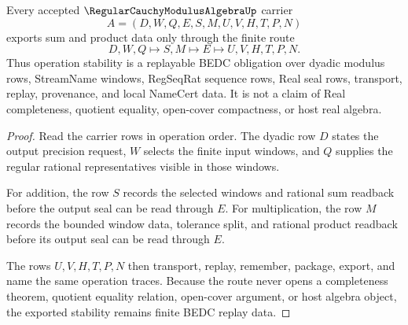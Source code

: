 \begin{theorem}
\label{thm:regular-cauchy-modulus-algebra-operation-replay}
Every accepted $\RegularCauchyModulusAlgebraUp$ carrier
$$
A=(D,W,Q,E,S,M,U,V,H,T,P,N)
$$
exports sum and product data only through the finite route
$$
D,W,Q \longmapsto S,M \longmapsto E \longmapsto U,V,H,T,P,N .
$$
Thus operation stability is a replayable BEDC obligation over dyadic modulus rows, StreamName windows, RegSeqRat sequence rows, Real seal rows, transport, replay, provenance, and local NameCert data. It is not a claim of Real completeness, quotient equality, open-cover compactness, or host real algebra.
\end{theorem}
\begin{proof}
Read the carrier rows in operation order. The dyadic row $D$ states the output precision request, $W$ selects the finite input windows, and $Q$ supplies the regular rational representatives visible in those windows.

For addition, the row $S$ records the selected windows and rational sum readback before the output seal can be read through $E$. For multiplication, the row $M$ records the bounded window data, tolerance split, and rational product readback before its output seal can be read through $E$.

The rows $U,V,H,T,P,N$ then transport, replay, remember, package, export, and name the same operation traces. Because the route never opens a completeness theorem, quotient equality relation, open-cover argument, or host algebra object, the exported stability remains finite BEDC replay data.
\end{proof}



